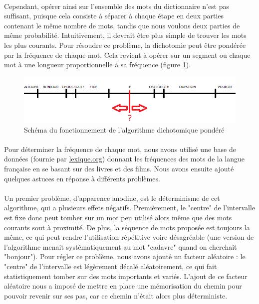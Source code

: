 \documentclass[11pt,a4paper]{article}
\theoremstyle{plain}
\theoremstyle{definition}
\begin{document}
\paragraph{} Cependant, opérer ainsi sur l'ensemble des mots du dictionnaire n'est pas suffisant, puisque cela consiste à séparer à chaque étape en deux parties contenant le même nombre de mots, tandis que nous voulons deux parties de même probabilité. Intuitivement, il devrait être plus simple de trouver les mots les plus courants. Pour résoudre ce problème, la dichotomie peut être pondérée par la fréquence de chaque mot. Cela revient à opérer sur un segment ou chaque mot à une longueur proportionnelle à sa fréquence (figure \ref{algo}).

\begin{figure}[h!]
\centering
\includegraphics[width=16cm]{schema_algo.png}
\caption{Schéma du fonctionnement de l'algorithme dichotomique pondéré}
\label{algo}
\end{figure}

\paragraph{} Pour déterminer la fréquence de chaque mot, nous avons utilisé une base de données (fournie par \href{http://lexique.org}{lexique.org}) donnant les fréquences des mots de la langue française en se basant sur des livres et des films. Nous avons ensuite ajouté quelques astuces en réponse à différents problèmes.
\paragraph{} Un premier problème, d'apparence anodine, est le déterminisme de cet algorithme, qui a plusieurs effets négatifs. Premièrement, le "centre" de l'intervalle est fixe donc peut tomber sur un mot peu utilisé alors même que des mots courants sout à proximité. De plus, la séquence de mots proposée est toujours la même, ce qui peut rendre l'utilisation répétitive voire désagréable (une version de l'algorithme menait systématiquement au mot "cadavre" quand on cherchait "bonjour"). Pour régler ce problème, nous avons ajouté un facteur aléatoire : le "centre" de l'intervalle est légèrement décalé aléatoirement, ce qui fait statistiquement tomber sur des mots importants et variés. L'ajout de ce facteur aléatoire nous a imposé de mettre en place une mémorisation du chemin pour pouvoir revenir sur ses pas, car ce chemin n'était alors plus déterministe.
\end{document}
